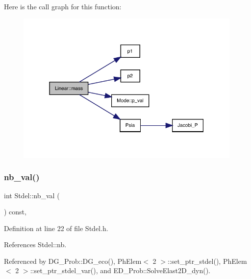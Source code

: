 Here is the call graph for this function\+:
\nopagebreak
\begin{figure}[H]
\begin{center}
\leavevmode
\includegraphics[width=315pt]{classLinear_aed8640c00d187985b5303c257323ed91_cgraph}
\end{center}
\end{figure}
\mbox{\label{classStdel_a4fb0a049dc27d8e67665a56d1b5a18ba}} 
\subsubsection{\texorpdfstring{nb\+\_\+val()}{nb\_val()}}
{\footnotesize\ttfamily int Stdel\+::nb\+\_\+val (\begin{DoxyParamCaption}{ }\end{DoxyParamCaption}) const\hspace{0.3cm}{\ttfamily [inline]}, {\ttfamily [inherited]}}



Definition at line 22 of file Stdel.\+h.



References Stdel\+::nb.



Referenced by D\+G\+\_\+\+Prob\+::\+D\+G\+\_\+eco(), Ph\+Elem$<$ 2 $>$\+::set\+\_\+ptr\+\_\+stdel(), Ph\+Elem$<$ 2 $>$\+::set\+\_\+ptr\+\_\+stdel\+\_\+var(), and E\+D\+\_\+\+Prob\+::\+Solve\+Elast2\+D\+\_\+dyn().

